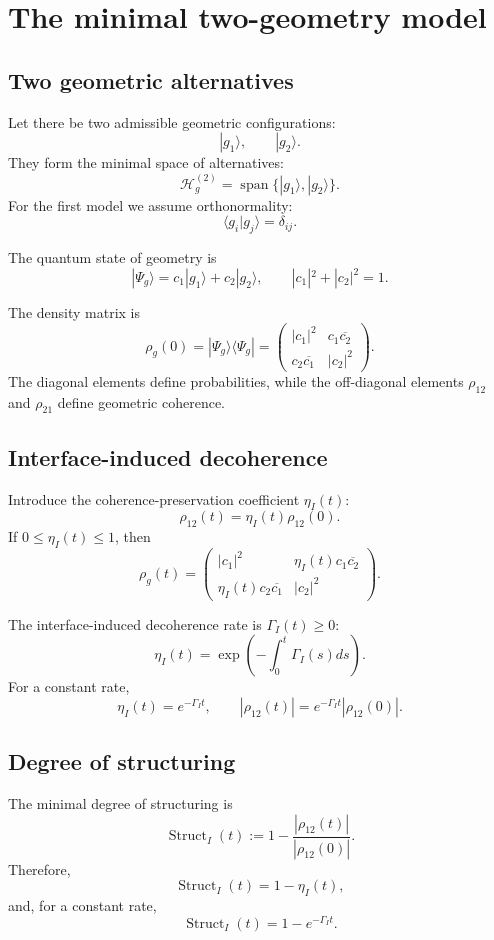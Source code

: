 \documentclass[12pt,a4paper]{article}
\DeclareMathOperator{\Struct}{Struct}
\newcommand{\Hilb}{\mathcal H}
\begin{document}
\section{The minimal two-geometry model}

\subsection{Two geometric alternatives}

Let there be two admissible geometric configurations:
\[
|g_1\rangle,
\qquad
|g_2\rangle.
\]
They form the minimal space of alternatives:
\[
\Hilb_g^{(2)}=\operatorname{span}\{|g_1\rangle,|g_2\rangle\}.
\]
For the first model we assume orthonormality:
\[
\langle g_i|g_j\rangle=\delta_{ij}.
\]

The quantum state of geometry is
\[
|\Psi_g\rangle=c_1|g_1\rangle+c_2|g_2\rangle,
\qquad
|c_1|^2+|c_2|^2=1.
\]

The density matrix is
\[
\rho_g(0)=|\Psi_g\rangle\langle\Psi_g|
=
\begin{pmatrix}
|c_1|^2 & c_1\overline{c_2}\\
c_2\overline{c_1} & |c_2|^2
\end{pmatrix}.
\]
The diagonal elements define probabilities, while the off-diagonal elements \(\rho_{12}\) and \(\rho_{21}\) define geometric coherence.

\subsection{Interface-induced decoherence}

Introduce the coherence-preservation coefficient \(\eta_I(t)\):
\[
\rho_{12}(t)=\eta_I(t)\rho_{12}(0).
\]
If \(0\leq\eta_I(t)\leq1\), then
\[
\rho_g(t)=
\begin{pmatrix}
|c_1|^2 & \eta_I(t)c_1\overline{c_2}\\
\eta_I(t)c_2\overline{c_1} & |c_2|^2
\end{pmatrix}.
\]

The interface-induced decoherence rate is \(\Gamma_I(t)\geq0\):
\[
\eta_I(t)=\exp\left(-\int_0^t\Gamma_I(s)ds\right).
\]
For a constant rate,
\[
\eta_I(t)=e^{-\Gamma_I t},
\qquad
|\rho_{12}(t)|=e^{-\Gamma_I t}|\rho_{12}(0)|.
\]

\subsection{Degree of structuring}

The minimal degree of structuring is
\[
\Struct_I(t):=1-\frac{|\rho_{12}(t)|}{|\rho_{12}(0)|}.
\]
Therefore,
\[
\Struct_I(t)=1-\eta_I(t),
\]
and, for a constant rate,
\[
\boxed{
\Struct_I(t)=1-e^{-\Gamma_I t}.
}
\]
\end{document}
